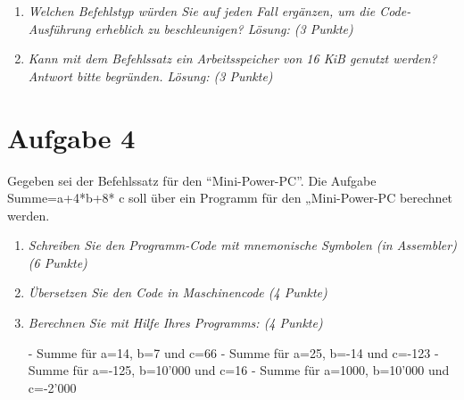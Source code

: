\documentclass[10pt]{article}
\begin{document}
\begin{enumerate}[label=\alph*)]
	\item
		\textit{Welchen Befehlstyp würden Sie auf jeden Fall ergänzen, um die Code-Ausführung erheblich zu beschleunigen? Lösung: (3 Punkte)}
		
		
	\item
		\textit{Kann mit dem Befehlssatz ein Arbeitsspeicher von 16 KiB genutzt werden? Antwort bitte begründen. Lösung: (3 Punkte)}
			
			
\end{enumerate}

\section*{Aufgabe 4}
Gegeben sei der Befehlssatz für den "`Mini-Power-PC"'. Die Aufgabe Summe=a+4*b+8* c soll über ein Programm für den „Mini-Power-PC berechnet werden.

\begin{enumerate}[label=\alph*)]
	\item
		\textit{Schreiben Sie den Programm-Code mit mnemonische Symbolen (in Assembler) (6 Punkte)}
		
	\item
			\textit{Übersetzen Sie den Code in Maschinencode (4 Punkte)}
			
	\item
			\textit{Berechnen Sie mit Hilfe Ihres Programms: (4 Punkte)}
			
			- Summe für a=14, b=7 und c=66
			- Summe für a=25, b=-14 und c=-123
			- Summe für a=-125, b=10’000 und c=16
			- Summe für a=1000, b=10’000 und c=-2’000
\end{enumerate}
\end{document}
